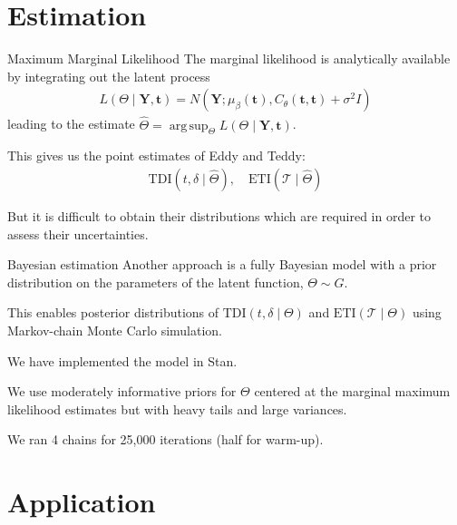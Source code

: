 \documentclass[ignorenonframetext,xcolor=pdflatex,table,dvipsnames,serif]{beamer}
\DeclareMathOperator*{\argsup}{arg\,sup}
\begin{document}
\section{Estimation}
\begin{frame}{Maximum Marginal Likelihood}
The marginal likelihood is analytically available by integrating out the latent process
\begin{align*}
  L(\Theta \mid \mathbf{Y}, \mathbf{t}) = N(\mathbf{Y}; \mu_\beta(\mathbf{t}), C_\theta(\mathbf{t}, \mathbf{t}) + \sigma^2 I)
\end{align*}
leading to the estimate $\widehat{\Theta} = \argsup_{\Theta} L(\Theta \mid \mathbf{Y}, \mathbf{t})$.

\vspace{1cm}

\pause

This gives us the \alert{point estimates} of Eddy and Teddy:
\begin{align*}
  \text{TDI}(t, \delta \mid \widehat{\Theta}), \quad   \text{ETI}(\mathcal{T} \mid \widehat{\Theta})
\end{align*}


But it is difficult to obtain their distributions which are required in order to assess their uncertainties.
\end{frame}




\begin{frame}{Bayesian estimation}
Another approach is a fully Bayesian model with a prior distribution on the parameters of the latent function, $\Theta \sim G$.

This enables posterior distributions of $\text{TDI}(t, \delta \mid \Theta)$ and $\text{ETI}(\mathcal{T} \mid \Theta)$ using Markov-chain Monte Carlo simulation.

We have implemented the model in Stan.

\vspace{1cm}

\pause 

We use moderately informative priors for $\Theta$ centered at the marginal maximum likelihood estimates but with heavy tails and large variances.

We ran 4 chains for 25,000 iterations (half for warm-up).
\end{frame}



\section{Application}
\end{document}
